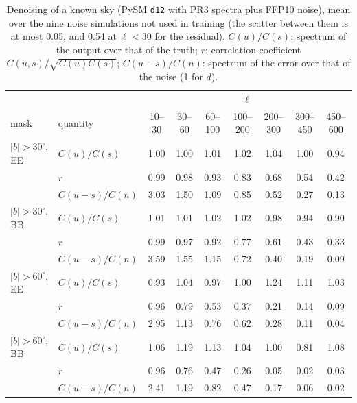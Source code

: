 \documentclass{aa}
\begin{document}
\begin{table}
  \caption{Denoising of a known sky (PySM \texttt{d12} with PR3 spectra plus FFP10 noise), mean over the nine noise simulations not used in training (the scatter between them is at most 0.05, and 0.54 at $\ell<30$ for the residual). $C(u)/C(s)$: spectrum of the output over that of the truth; $r$: correlation coefficient $C(u,s)/\sqrt{C(u)C(s)}$; $C(u-s)/C(n)$: spectrum of the error over that of the noise (1 for $d$).}
  \label{tab:sim}
  \centering
  \footnotesize
  \setlength{\tabcolsep}{4pt}
  \begin{tabular}{llccccccc}
    \hline
    & & \multicolumn{7}{c}{$\ell$} \\
    mask & quantity & 10--30 & 30--60 & 60--100 & 100--200 & 200--300 & 300--450 & 450--600 \\
    \hline
    $|b|>30^\circ$, EE & $C(u)/C(s)$ & 1.00 & 1.00 & 1.01 & 1.02 & 1.04 & 1.00 & 0.94 \\
     & $r$ & 0.99 & 0.98 & 0.93 & 0.83 & 0.68 & 0.54 & 0.42 \\
     & $C(u-s)/C(n)$ & 3.03 & 1.50 & 1.09 & 0.85 & 0.52 & 0.27 & 0.13 \\
    $|b|>30^\circ$, BB & $C(u)/C(s)$ & 1.01 & 1.01 & 1.02 & 1.02 & 0.98 & 0.94 & 0.90 \\
     & $r$ & 0.99 & 0.97 & 0.92 & 0.77 & 0.61 & 0.43 & 0.33 \\
     & $C(u-s)/C(n)$ & 3.59 & 1.55 & 1.15 & 0.72 & 0.40 & 0.19 & 0.09 \\
    $|b|>60^\circ$, EE & $C(u)/C(s)$ & 0.93 & 1.04 & 0.97 & 1.00 & 1.24 & 1.11 & 1.03 \\
     & $r$ & 0.96 & 0.79 & 0.53 & 0.37 & 0.21 & 0.14 & 0.09 \\
     & $C(u-s)/C(n)$ & 2.95 & 1.13 & 0.76 & 0.62 & 0.28 & 0.11 & 0.04 \\
    $|b|>60^\circ$, BB & $C(u)/C(s)$ & 1.06 & 1.19 & 1.13 & 1.04 & 1.00 & 0.81 & 1.08 \\
     & $r$ & 0.96 & 0.76 & 0.47 & 0.26 & 0.05 & 0.02 & 0.03 \\
     & $C(u-s)/C(n)$ & 2.41 & 1.19 & 0.82 & 0.47 & 0.17 & 0.06 & 0.02 \\
    \hline
  \end{tabular}
\end{table}
\end{document}
